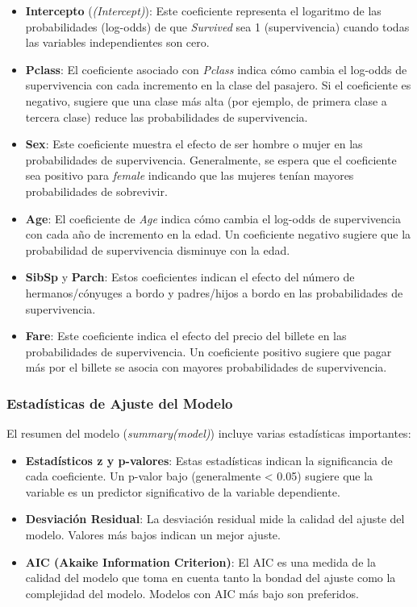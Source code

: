 \begin{itemize}
    \item \textbf{Intercepto} (\textit{(Intercept)}): Este coeficiente representa el logaritmo de las probabilidades (log-odds) de que \textit{Survived} sea 1 (supervivencia) cuando todas las variables independientes son cero.
    \item \textbf{Pclass}: El coeficiente asociado con \textit{Pclass} indica cómo cambia el log-odds de supervivencia con cada incremento en la clase del pasajero. Si el coeficiente es negativo, sugiere que una clase más alta (por ejemplo, de primera clase a tercera clase) reduce las probabilidades de supervivencia.
    \item \textbf{Sex}: Este coeficiente muestra el efecto de ser hombre o mujer en las probabilidades de supervivencia. Generalmente, se espera que el coeficiente sea positivo para \textit{female} indicando que las mujeres tenían mayores probabilidades de sobrevivir.
    \item \textbf{Age}: El coeficiente de \textit{Age} indica cómo cambia el log-odds de supervivencia con cada año de incremento en la edad. Un coeficiente negativo sugiere que la probabilidad de supervivencia disminuye con la edad.
    \item \textbf{SibSp} y \textbf{Parch}: Estos coeficientes indican el efecto del número de hermanos/cónyuges a bordo y padres/hijos a bordo en las probabilidades de supervivencia.
    \item \textbf{Fare}: Este coeficiente indica el efecto del precio del billete en las probabilidades de supervivencia. Un coeficiente positivo sugiere que pagar más por el billete se asocia con mayores probabilidades de supervivencia.
\end{itemize}

\subsubsection*{Estadísticas de Ajuste del Modelo}

El resumen del modelo (\textit{summary(model)}) incluye varias estadísticas importantes:

\begin{itemize}
    \item \textbf{Estadísticos z y p-valores}: Estas estadísticas indican la significancia de cada coeficiente. Un p-valor bajo (generalmente < 0.05) sugiere que la variable es un predictor significativo de la variable dependiente.
    \item \textbf{Desviación Residual}: La desviación residual mide la calidad del ajuste del modelo. Valores más bajos indican un mejor ajuste.
    \item \textbf{AIC (Akaike Information Criterion)}: El AIC es una medida de la calidad del modelo que toma en cuenta tanto la bondad del ajuste como la complejidad del modelo. Modelos con AIC más bajo son preferidos.
\end{itemize}

